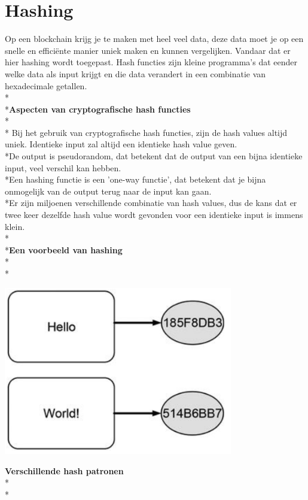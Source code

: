 \documentclass[fleqn,a4paper,12pt]{book}
\begin{document}
\section{Hashing}
Op een blockchain krijg je te maken met heel veel data, deze data moet je op een snelle en efficiënte manier uniek maken en kunnen vergelijken. Vandaar dat er hier hashing wordt toegepast. Hash functies zijn kleine programma's dat eender welke data als input krijgt en die data verandert in een combinatie van hexadecimale getallen.
\\*\\*\textbf{Aspecten van cryptografische hash functies}\\*\\*
Bij het gebruik van cryptografische hash functies, zijn de hash values altijd uniek. Identieke input zal altijd een identieke hash value geven.\\*De output is pseudorandom, dat betekent dat de output van een bijna identieke input, veel verschil kan hebben.\\*Een hashing functie is een 'one-way functie', dat betekent dat je bijna onmogelijk van de output terug naar de input kan gaan.\\*Er zijn miljoenen verschillende combinatie van hash values, dus de kans dat er twee keer dezelfde hash value wordt gevonden voor een identieke input is immens klein.
\\*\\*\textbf{Een voorbeeld van hashing}~\autocite{blockchain1}\\*\\*
\begin{center}
	\includegraphics[width=10cm]{img/hashing}\\[1cm]
\end{center}
\textbf{Verschillende hash patronen}\\*\\*
\end{document}
